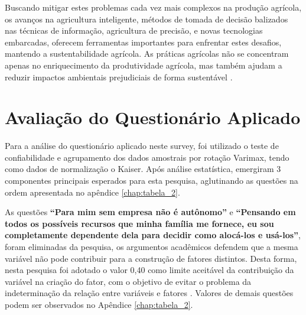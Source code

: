 Buscando mitigar estes problemas cada vez mais complexos na produção agrícola, os avanços na agricultura inteligente, métodos de tomada de decisão balizados nas técnicas de informação, agricultura de precisão, e novas tecnologias embarcadas, oferecem ferramentas importantes para enfrentar estes desafios, mantendo a sustentabilidade agrícola. As práticas agrícolas não se concentram apenas no enriquecimento da produtividade agrícola, mas também ajudam a reduzir impactos ambientais prejudiciais de forma sustentável \cite{adnan_effects_2018,rockstrom_sustainable_2017,ye_bio-organic_2020}.


\section{Avaliação do Questionário Aplicado}

Para a análise do questionário aplicado neste survey, foi utilizado o teste de confiabilidade e agrupamento dos dados amostrais por rotação Varimax, tendo como dados de normalização o Kaiser\footnotemark[1]. Após análise estatística, emergiram 3 componentes principais esperados para esta pesquisa, aglutinando as questões na ordem apresentada no apêndice \ref{chap:tabela_2}.


As questões \textbf{“Para mim sem empresa não é autônomo”} e \textbf{“Pensando em todos os possíveis recursos que minha família me fornece, eu sou completamente dependente dela para decidir como alocá-los e usá-los”}, foram eliminadas da pesquisa, os argumentos acadêmicos defendem que a mesma variável não pode contribuir para a construção de fatores distintos. Desta forma, nesta pesquisa foi adotado o valor 0,40 como limite aceitável da contribuição da variável na criação do fator, com o objetivo de evitar o problema da indeterminação da relação entre variáveis e fatores \cite{figueiredo_filho_visao_2010}. Valores de demais questões podem ser observados no  Apêndice \ref{chap:tabela_2}. 




